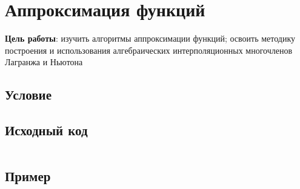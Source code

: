 
\usepackage{minted}





\section{Аппроксимация функций}

\textbf{Цель работы}: изучить алгоритмы аппроксимации функций; освоить методику построения и использования алгебраических интерполяционных многочленов Лагранжа и Ньютона

\subsection{Условие}



\subsection{Исходный код}
\inputminted[fontsize=\footnotesize]{c}{../task.c}

\subsection{Пример}
\inputminted[fontsize=\fontsize{1}{1}]{text}{examples/example.txt}


